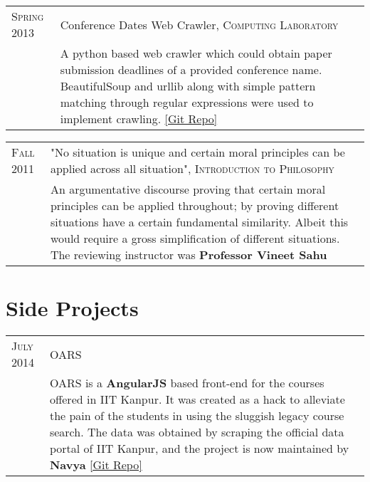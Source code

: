 \documentclass[a4paper,10pt]{article} %
\begin{document}
\begin{tabular}{>{\raggedleft}p{2.2cm}|p{14cm}}
    \textsc{Spring 2013} & Conference Dates Web Crawler, \textsc{Computing Laboratory} \\
                         & \footnotesize{A python based web crawler which could obtain paper submission
                            deadlines of a provided conference name.  BeautifulSoup and urllib along
                            with simple pattern matching through regular expressions were used to implement crawling.
                            \href{https://github.com/srijanshetty/crawler} {[Git Repo]} } \\
\end{tabular}

\begin{tabular}{>{\raggedleft}p{2.2cm}|p{14cm}}
    \textsc{Fall 2011} & "No situation is unique and certain moral principles can be applied across all situation",
                         \textsc{Introduction to Philosophy} \\
                       & \footnotesize{ An argumentative discourse proving that certain moral principles
                         can be applied throughout; by proving different situations have a certain
                         fundamental similarity.  Albeit this would require a gross simplification of
                         different situations.  The reviewing instructor was \textbf{Professor Vineet Sahu}} \\
\end{tabular}

\section{Side Projects}

\begin{tabular}{>{\raggedleft}p{2.2cm}|p{14cm}}
    \textsc{July 2014} & OARS\\
                       & \footnotesize{OARS is a \textbf{AngularJS} based front-end for the
                          courses offered in IIT Kanpur. It was created as a
                          hack to alleviate the pain of the students in using the
                          sluggish legacy course search. The data was obtained by
                          scraping the official data portal of IIT Kanpur, and the
                          project is now maintained by \textbf{Navya}
                          \href{https://github.com/navya/oars} {[Git Repo]} }\\

\end{tabular}
\end{document}
